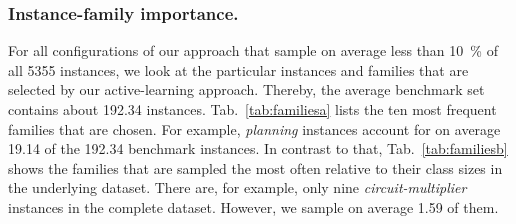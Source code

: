 \documentclass[runningheads]{llncs}
\begin{document}
\subsubsection{Instance-family importance.}
For all configurations of our approach that sample on average less than \SI{10}{\%} of all 5355 instances, we look at the particular instances and families that are selected by our active-learning approach.
Thereby, the average benchmark set contains about \SI{192.34}{} instances.
Tab.~\ref{tab:familiesa} lists the ten most frequent families that are chosen. For example, \textit{planning} instances account for on average \SI{19.14}{} of the \SI{192.34}{} benchmark instances.
In contrast to that, Tab.~\ref{tab:familiesb} shows the families that are sampled the most often relative to their class sizes in the underlying dataset.
There are, for example, only nine \textit{circuit-multiplier} instances in the complete dataset.
However, we sample on average \SI{1.59}{} of them.
\end{document}
